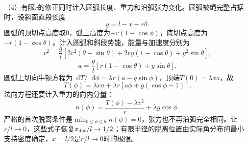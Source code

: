 \documentclass[UTF8,fontset=fandol,a4paper,11pt]{ctexart}
\newcommand{\dd}{\mathop{}\!\mathrm{d}}
\begin{document}
（4）有限$r$的修正同时计入圆弧长度、重力和沿弧张力变化。圆弧被绳完整占据时，设斜面直段长度
\[
y=l-x-r\theta.
\]
圆弧的顶切点高度取0，弧上高度为$-r(1-\cos\phi)$，底切点高度为$-r(1-\cos\theta)$。计入圆弧和斜段势能，能量与加速度分别为
\[
v^2=\frac gl\left[
2r^2(\theta-\sin\theta)+2ry(1-\cos\theta)+y^2\sin\theta
\right],
\]
\[
a=\frac gl\left[r(1-\cos\theta)+y\sin\theta\right].
\]
圆弧上切向牛顿方程为$\dd T/\dd\phi=\lambda r(a-g\sin\phi)$，顶端$T(0)=\lambda xa$，故
\[
T(\phi)=\lambda xa+\lambda r\left[a\phi+g(\cos\phi-1)\right].
\]
法向方程还要计入重力的向内分量：
\[
\boxed{n(\phi)=\frac{T(\phi)-\lambda v^2}{r}
+\lambda g\cos\phi}.
\]
严格的首次脱离条件是$\min_{0\le\phi\le\theta}n(\phi)=0$，张力也不再沿弧完全相同。让$r/l\to0$，这些式子恢复$x_{\rm det}/l\to1/2$；有限半径的脱离位置由实际角分布的最小支持密度确定，$x=l/2$是$r/l\to0$时的极限。
\end{document}
